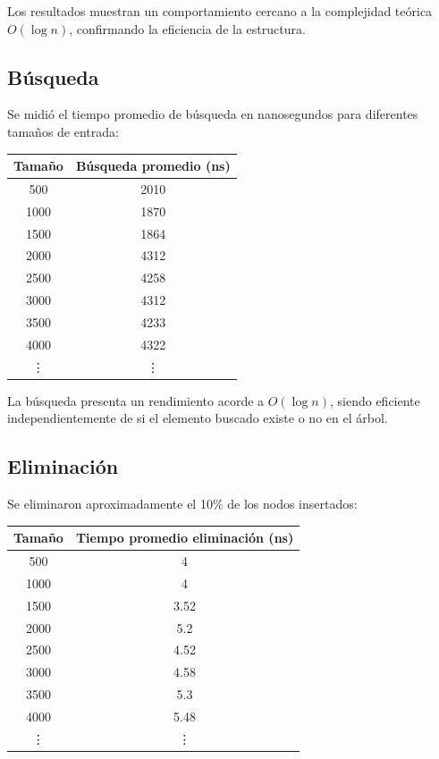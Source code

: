 \documentclass[conference]{IEEEtran}
\begin{document}
\vspace{1em}

\noindent Los resultados muestran un comportamiento cercano a la complejidad teórica $O(\log n)$, confirmando la eficiencia de la estructura.

\subsection{Búsqueda}

Se midió el tiempo promedio de búsqueda en nanosegundos para diferentes tamaños de entrada:

\vspace{0.5em}

\begin{center}
\begin{tabular}{cc}
\toprule
\textbf{Tamaño} & \textbf{Búsqueda promedio (ns)} \\
\midrule
500   & 2010 \\
1000  & 1870 \\
1500  & 1864 \\
2000  & 4312 \\
2500  & 4258 \\
3000  & 4312 \\
3500  & 4233 \\
4000  & 4322 \\
\vdots & \vdots \\
\bottomrule
\end{tabular}
\end{center}

\vspace{1em}

La búsqueda presenta un rendimiento acorde a $O(\log n)$, siendo eficiente independientemente de si el elemento buscado existe o no en el árbol.

\subsection{Eliminación}

Se eliminaron aproximadamente el 10\% de los nodos insertados:

\vspace{0.5em}

\begin{center}
\begin{tabular}{cc}
\toprule
\textbf{Tamaño} & \textbf{Tiempo promedio eliminación (ns)} \\
\midrule
500 & 4 \\
1000 & 4 \\
1500  & 3.52 \\
2000  & 5.2 \\
2500  & 4.52 \\
3000  & 4.58 \\
3500  & 5.3 \\
4000  & 5.48 \\
\vdots & \vdots \\
\bottomrule
\end{tabular}
\end{center}
\end{document}
